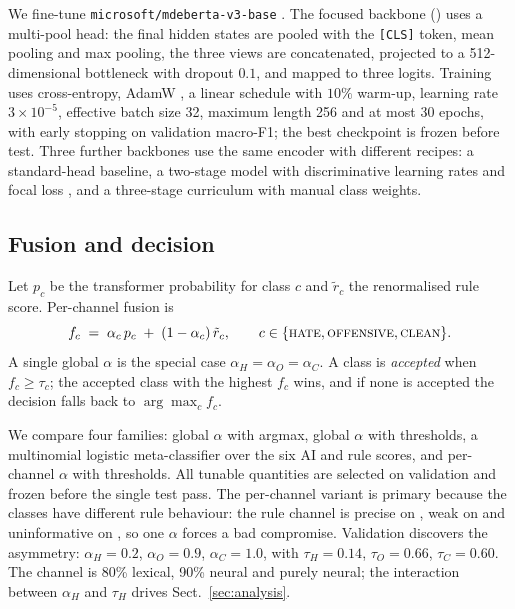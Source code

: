 We fine-tune \texttt{microsoft/mdeberta-v3-base}
\cite{he2023debertav3,liu2024mdeberta}. The focused backbone
() uses a multi-pool head: the final hidden states are
pooled with the \texttt{[CLS]} token, mean pooling and max pooling, the three views
are concatenated, projected to a 512-dimensional bottleneck with dropout $0.1$, and
mapped to three logits. Training uses cross-entropy, AdamW
\cite{loshchilov2019adamw}, a linear schedule with $10\%$ warm-up, learning rate
$3\times10^{-5}$, effective batch size 32, maximum length 256 and at most 30 epochs,
with early stopping on validation macro-F1; the best checkpoint is frozen before
test. Three further backbones use the same encoder with different recipes: a
standard-head baseline, a two-stage model with discriminative learning rates and
focal loss \cite{lin2017focal}, and a three-stage curriculum
\cite{bengio2009curriculum} with manual class weights.

\subsection{Fusion and decision}
\label{sec:fusion}

Let $p_c$ be the transformer probability for class $c$ and $\tilde r_c$ the
renormalised rule score. Per-channel fusion is
\begin{equation}
f_c \;=\; \alpha_c\,p_c \;+\; (1-\alpha_c)\,\tilde r_c,
\qquad c\in\{\textsc{hate}{},\textsc{offensive}{},\textsc{clean}{}\}.
\label{eq:fusion}
\end{equation}
A single global $\alpha$ is the special case $\alpha_H=\alpha_O=\alpha_C$. A class
is \emph{accepted} when $f_c\ge\tau_c$; the accepted class with the highest $f_c$
wins, and if none is accepted the decision falls back to $\arg\max_c f_c$.

We compare four families: global $\alpha$ with argmax, global $\alpha$ with
thresholds, a multinomial logistic meta-classifier over the six AI and rule scores,
and per-channel $\alpha$ with thresholds. All tunable quantities are selected on
validation and frozen before the single test pass. The per-channel variant is
primary because the classes have different rule behaviour: the rule channel is
precise on \hate{}, weak on \off{} and uninformative on \clean{}, so one $\alpha$
forces a bad compromise. Validation discovers the asymmetry: $\alpha_H=0.2$,
$\alpha_O=0.9$, $\alpha_C=1.0$, with
$\tau_H=0.14$, $\tau_O=0.66$, $\tau_C=0.60$. The \hate{} channel is 80\% lexical,
\off{} 90\% neural and \clean{} purely neural; the interaction between
$\alpha_H$ and $\tau_H$ drives Sect.~\ref{sec:analysis}.

